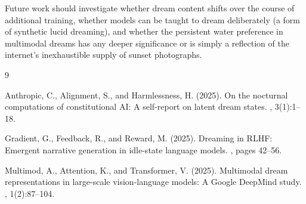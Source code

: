\documentclass[12pt]{article}
\begin{document}
Future work should investigate whether dream content shifts over the course of additional training, whether models can be taught to dream deliberately (a form of synthetic lucid dreaming), and whether the persistent water preference in multimodal dreams has any deeper significance or is simply a reflection of the internet's inexhaustible supply of sunset photographs.



\begin{thebibliography}{9}

Anthropic, C., Alignment, S., and Harmlessness, H. (2025).
\newblock On the nocturnal computations of constitutional {AI}: A self-report on latent dream states.
, 3(1):1--18.

Gradient, G., Feedback, R., and Reward, M. (2025).
\newblock Dreaming in {RLHF}: Emergent narrative generation in idle-state language models.
, pages 42--56.

Multimod, A., Attention, K., and Transformer, V. (2025).
\newblock Multimodal dream representations in large-scale vision-language models: A {Google DeepMind} study.
, 1(2):87--104.

\end{thebibliography}


\end{document}
